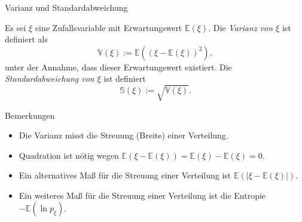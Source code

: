 \documentclass[
  8pt,
  ignorenonframetext,
]{beamer}
\providecommand{\tightlist}{%
  \setlength{\itemsep}{0pt}\setlength{\parskip}{0pt}}
\begin{document}
\begin{frame}{Varianz und Standardabweichung}
\protect\hypertarget{varianz-und-standardabweichung}{}
\small
\begin{definition}
\justifying
Es sei $\xi$ eine Zufallsvariable mit Erwartungswert $\mathbb{E}(\xi)$. 
Die \textit{Varianz von $\xi$} ist definiert als
\begin{equation}
\mathbb{V}(\xi) := \mathbb{E}\left((\xi - \mathbb{E}(\xi))^2\right),
\end{equation}
unter der Annahme, dass dieser Erwartungswert existiert. Die 
\textit{Standardabweichung von $\xi$} ist definiert
\begin{equation}
\mathbb{S}(\xi) := \sqrt{\mathbb{V}(\xi)}.
\end{equation}
\end{definition}

Bemerkungen

\begin{itemize}
\tightlist
\item
  Die Varianz misst die Streuung (Breite) einer Verteilung.
\item
  Quadration ist nötig wegen
  \(\mathbb{E}(\xi-\mathbb{E}(\xi)) = \mathbb{E}(\xi) - \mathbb{E}(\xi) = 0\).
\item
  Ein alternatives Maß für die Streuung einer Verteilung ist
  \(\mathbb{E}(|\xi - \mathbb{E}(\xi)|)\).
\item
  Ein weiteres Maß für die Streuung einer Verteilung ist die Entropie
  \(-\mathbb{E}(\ln p_\xi)\).
\end{itemize}
\end{frame}
\end{document}
